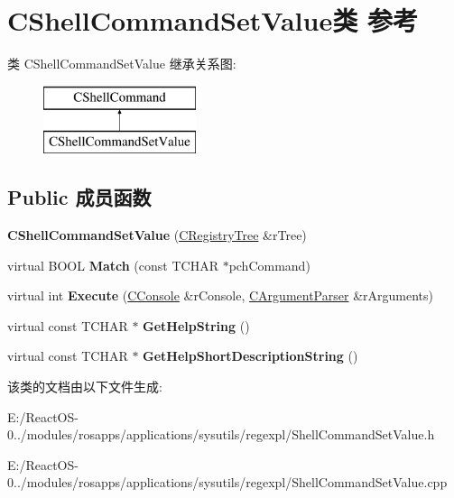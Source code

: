 \hypertarget{class_c_shell_command_set_value}{}\section{C\+Shell\+Command\+Set\+Value类 参考}
\label{class_c_shell_command_set_value}
类 C\+Shell\+Command\+Set\+Value 继承关系图\+:\begin{figure}[H]
\begin{center}
\leavevmode
\includegraphics[height=2.000000cm]{class_c_shell_command_set_value}
\end{center}
\end{figure}
\subsection*{Public 成员函数}
\begin{DoxyCompactItemize}
\item 
\mbox{\label{class_c_shell_command_set_value_af0492f5d92a11e967157b99bff6051d7}} 
{\bfseries C\+Shell\+Command\+Set\+Value} (\hyperlink{class_c_registry_tree}{C\+Registry\+Tree} \&r\+Tree)
\item 
\mbox{\label{class_c_shell_command_set_value_ac3576a201a6d7521c155ede958a7f020}} 
virtual B\+O\+OL {\bfseries Match} (const T\+C\+H\+AR $\ast$pch\+Command)
\item 
\mbox{\label{class_c_shell_command_set_value_a1e60d0c570e7820d7a7977f614fec460}} 
virtual int {\bfseries Execute} (\hyperlink{class_c_console}{C\+Console} \&r\+Console, \hyperlink{class_c_argument_parser}{C\+Argument\+Parser} \&r\+Arguments)
\item 
\mbox{\label{class_c_shell_command_set_value_a9ece4e428de0eaa5d12a6a3629039345}} 
virtual const T\+C\+H\+AR $\ast$ {\bfseries Get\+Help\+String} ()
\item 
\mbox{\label{class_c_shell_command_set_value_a62d0917678b5d48d60bfeaed562432cd}} 
virtual const T\+C\+H\+AR $\ast$ {\bfseries Get\+Help\+Short\+Description\+String} ()
\end{DoxyCompactItemize}


该类的文档由以下文件生成\+:\begin{DoxyCompactItemize}
\item 
E\+:/\+React\+O\+S-\/0../modules/rosapps/applications/sysutils/regexpl/Shell\+Command\+Set\+Value.\+h\item 
E\+:/\+React\+O\+S-\/0../modules/rosapps/applications/sysutils/regexpl/Shell\+Command\+Set\+Value.\+cpp\end{DoxyCompactItemize}
